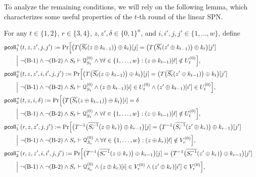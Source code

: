 \documentclass[journal=tosc,final,nohyperref]{iacrtrans}
\begin{document}
To analyze the remaining conditions, we will rely on the following lemma, which characterizes some useful properties of the $t$-th round of the linear SPN.

\begin{lemma}
	\label{lemma:coll-prob}
	
	For any $t\in\{1,2\}$, $r\in\{3,4\}$, $z,z',\delta\in\{0,1\}^n$, and $i,i',j,j'\in\{1,\ldots,w\}$, define      {\small
	\begin{align*}
	&\pcoll_{1}^+(t,z,z',j,j')  :={\Pr}\Big[\big(T\big(\overline{S_t}(z\xor k_{t-1})\big)\xor k_t\big)[j]=\big(T\big(\overline{S_t}(z'\xor k_{t-1})\big)\xor k_t\big)[j']       \\
	&\midindent~\Big|~\neg\bone\wedge\neg\btwo\wedge S_t\vdash\mathcal{Q}_{S_t}^{(0)}\wedge\forall\ell\in\{1,\ldots,w\}:(z\xor k_{t-1})[\ell]\notin U_t^{(0)}\Big],         \\
	&\pcoll_{2}^+(t,z,z',i,i',j,j')      :={\Pr}\Big[\big(T\big(\overline{S_t}(z\xor k_{t-1})\big)\xor k_t\big)[j]=\big(T\big(\overline{S_t}(z'\xor k_{t-1})\big)\xor k_t\big)[j']   \\
	&\midindent~\Big|~\neg\bone\wedge\neg\btwo\wedge S_t\vdash\mathcal{Q}_{S_t}^{(0)}\wedge(z\xor k_{t-1})[i]\in U_t^{(0)}\wedge(z'\xor k_{t-1})[i']\in U_t^{(0)}\Big],         \\
	&\pcoll_{3}^+(t,z,i,\delta)      :={\Pr}\Big[\big(T\big(\overline{S_t}(z\xor k_{t-1})\big)\xor k_t\big)[i]=\delta    \\
	&\midindent~\Big|~\neg\bone\wedge\neg\btwo\wedge S_t\vdash\mathcal{Q}_{S_t}^{(0)}\wedge\forall\ell\in\{1,\ldots,w\}:(z\xor k_{t-1})[\ell]\notin U_t^{(0)}\Big],         \\
	&\pcoll_{1}^-(r,z,z',j,j')     :={\Pr}\Big[\big(T^{-1}\big(\overline{S_r^{-1}}(z\xor k_r)\big)\xor k_{r-1}\big)[j]=\big(T^{-1}\big(\overline{S_r^{-1}}(z'\xor k_r)\big)\xor k_{r-1}\big)[j']    \\
	&\midindent~\Big|~\neg\bone\wedge\neg\btwo\wedge S_r\vdash\mathcal{Q}_{S_r}^{(0)}\wedge\forall\ell\in\{1,\ldots,w\}:(z\xor k_r)[\ell]\notin V_r^{(0)}\Big],         \\
	&\pcoll_{2}^-(r,z,z',i,i',j,j')    :={\Pr}\Big[\big(T^{-1}\big(\overline{S_r^{-1}}(z\xor k_r)\big)\xor k_{r-1}\big)[j]=\big(T^{-1}\big(\overline{S_r^{-1}}(z'\xor k_r)\big)\xor k_{r-1}\big)[j']     \\
	&\midindent~\Big|~\neg\bone\wedge\neg\btwo\wedge S_r\vdash\mathcal{Q}_{S_r}^{(0)}\wedge(z\xor k_r)[i]\in V_r^{(0)}\wedge(z'\xor k_r)[i']\in V_r^{(0)}\Big],         \\

\end{align*}}
\end{lemma}
\end{document}
